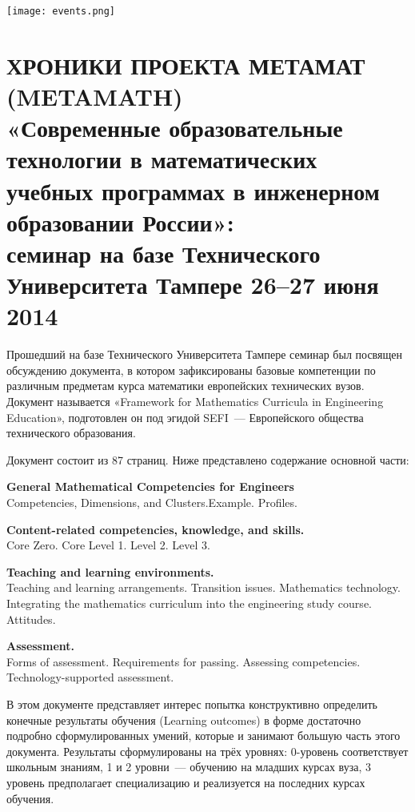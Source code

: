 \documentclass[intlimits,twoside,a4paper,11pt]{article}
\begin{document}
\noindent\texttt{[image: events.png]}

\section*{ХРОНИКИ ПРОЕКТА МЕТАМАТ (METAMATH) 
\\«Современные образовательные технологии в математических учебных программах в инженерном образовании России»:\\ 
семинар на базе Технического Университета Тампере 26--27 июня 2014}

Прошедший на базе Технического Университета Тампере семинар был посвящен обсуждению документа, в котором зафиксированы базовые компетенции по различным предметам курса математики европейских технических вузов. Документ называется «Framework for Mathematics Curricula in Engineering Education», подготовлен он под эгидой SEFI~--- Европейского общества технического образования.

Документ состоит из 87 страниц. Ниже представлено содержание основной части:

\textbf{General Mathematical Competencies for Engineers}\\ 
Competencies, Dimensions, and Clusters.\quad\quad Example.   \quad\quad Profiles.

\textbf{Content-related competencies, knowledge, and skills.}\\
Core Zero.  \quad\quad  Core Level 1.  \quad\quad  Level 2. \quad\quad  Level 3.

\textbf{Teaching and learning environments.}\\
Teaching and learning arrangements.  \quad\quad  Transition issues.  \quad\quad  Mathematics technology.  \quad\quad  Integrating the mathematics curriculum into the engineering study course.  \quad\quad  Attitudes.

\textbf{Assessment.}\\ 
Forms of assessment.  \quad\quad  Requirements for passing.  \quad\quad  Assessing competencies.  \quad\quad  Technology-supported assessment.

В этом документе представляет интерес попытка конструктивно определить конечные результаты обучения (Learning outcomes) в форме достаточно подробно сформулированных умений, которые и занимают большую часть этого документа. Результаты сформулированы на трёх уровнях: 0-уровень соответствует школьным знаниям, 1 и 2 уровни~--- обучению на младших курсах вуза, 3 уровень предполагает специализацию и реализуется на последних курсах обучения.
\end{document}
